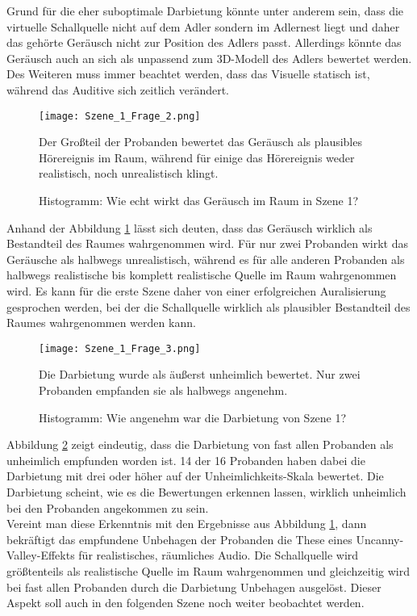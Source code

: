 Grund für die eher suboptimale Darbietung könnte unter anderem sein, dass die virtuelle Schallquelle nicht auf dem Adler sondern im Adlernest liegt und daher das gehörte Geräusch nicht zur Position des Adlers passt. Allerdings könnte das Geräusch auch an sich als unpassend zum 3D-Modell des Adlers bewertet werden. Des Weiteren muss immer beachtet werden, dass das Visuelle statisch ist, während das Auditive sich zeitlich verändert. \\ 


   \begin{figure}[H]
\centering
\texttt{[image: Szene\_1\_Frage\_2.png]}
\caption{Histogramm: Wie echt wirkt das Geräusch im Raum in Szene 1?}
Der Großteil der Probanden bewertet das Geräusch als plausibles Hörereignis im Raum, während für einige das Hörereignis weder realistisch, noch unrealistisch klingt.
\label{fig:Szene_1_Frage2}
\end{figure} 
\vspace*{30pt}

Anhand der Abbildung \ref{fig:Szene_1_Frage2} lässt sich deuten, dass das Geräusch wirklich als Bestandteil des Raumes wahrgenommen wird. Für nur zwei Probanden wirkt das Geräusche als halbwegs unrealistisch, während es für alle anderen Probanden als halbwegs realistische bis komplett realistische Quelle im Raum wahrgenommen wird. Es kann für die erste Szene daher von einer erfolgreichen Auralisierung gesprochen werden, bei der die Schallquelle wirklich als plausibler Bestandteil des Raumes wahrgenommen werden kann. 

\begin{figure}[H]
\centering
\texttt{[image: Szene\_1\_Frage\_3.png]}
\caption{Histogramm: Wie angenehm war die Darbietung von Szene 1?}
Die Darbietung wurde als äußerst unheimlich bewertet. Nur zwei Probanden empfanden sie als halbwegs angenehm. 
\label{fig:Szene_1_Frage3}
\end{figure} 


Abbildung \ref{fig:Szene_1_Frage3} zeigt eindeutig, dass die Darbietung von fast allen Probanden als unheimlich empfunden worden ist. 14 der 16 Probanden haben dabei die Darbietung mit drei oder höher auf der \glqq Unheimlichkeits\grqq{}-Skala bewertet. Die Darbietung scheint, wie es die Bewertungen erkennen lassen, wirklich unheimlich bei den Probanden angekommen zu sein.\\

Vereint man diese Erkenntnis mit den Ergebnisse aus Abbildung \ref{fig:Szene_1_Frage2}, dann bekräftigt das empfundene Unbehagen der Probanden die These eines \glqq Uncanny-Valley\grqq{}-Effekts für realistisches, räumliches Audio. Die Schallquelle wird größtenteils als realistische Quelle im Raum wahrgenommen und gleichzeitig wird bei fast allen Probanden durch die Darbietung Unbehagen ausgelöst. Dieser Aspekt soll auch in den folgenden Szene noch weiter beobachtet werden. \\

